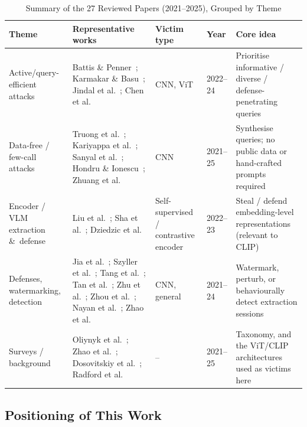 \documentclass[journal,10pt]{IEEEtran}
\begin{document}
\begin{table}[t]
\centering
\caption{Summary of the 27 Reviewed Papers (2021--2025), Grouped by Theme}
\label{tab:litreview}
\begin{tabular}{@{}p{}p{}p{}p{}p{}@{}}
\toprule
\textbf{Theme} & \textbf{Representative works} & \textbf{Victim type} & \textbf{Year} & \textbf{Core idea} \\
\midrule
Active/query-efficient attacks &
Battis \& Penner~\cite{battis2022vitextraction}; Karmakar \& Basu~\cite{karmakar2023marich};
Jindal et al.~\cite{jindal2024armyofthieves}; Chen et al.~\cite{chen2023ddae} &
CNN, ViT & 2022--24 & Prioritise informative / diverse / defense-penetrating queries \\
\addlinespace
Data-free / few-call attacks &
Truong et al.~\cite{truong2021dfme}; Kariyappa et al.~\cite{kariyappa2021maze};
Sanyal et al.~\cite{sanyal2022hardlabel}; Hondru \& Ionescu~\cite{hondru2025aspkd};
Zhuang et al.~\cite{zhuang2025stealix} &
CNN & 2021--25 & Synthesise queries; no public data or hand-crafted prompts required \\
\addlinespace
Encoder / VLM extraction \&\ defense &
Liu et al.~\cite{liu2022stolenencoder}; Sha et al.~\cite{sha2023contsteal};
Dziedzic et al.~\cite{dziedzic2022ssldefense,dziedzic2023b4b} &
Self-supervised / contrastive encoder & 2022--23 & Steal / defend embedding-level representations (relevant to CLIP) \\
\addlinespace
Defenses, watermarking, detection &
Jia et al.~\cite{jia2021entangled}; Szyller et al.~\cite{szyller2021dawn};
Tang et al.~\cite{tang2023exposingtheft,tang2024modelguard}; Tan et al.~\cite{tan2023dnnwatermark};
Zhu et al.~\cite{zhu2024reliablewatermark}; Zhou et al.~\cite{zhou2024inversionguided};
Nayan et al.~\cite{nayan2024sok}; Zhao et al.~\cite{zhao2024superpixel} &
CNN, general & 2021--24 & Watermark, perturb, or behaviourally detect extraction sessions \\
\addlinespace
Surveys / background &
Oliynyk et al.~\cite{oliynyk2023survey}; Zhao et al.~\cite{zhao2025systematic,zhao2025llmsurvey};
Dosovitskiy et al.~\cite{dosovitskiy2021vit}; Radford et al.~\cite{radford2021clip} &
-- & 2021--25 & Taxonomy, and the ViT/CLIP architectures used as victims here \\
\bottomrule
\end{tabular}
\end{table}

\subsection{Positioning of This Work}
\end{document}
